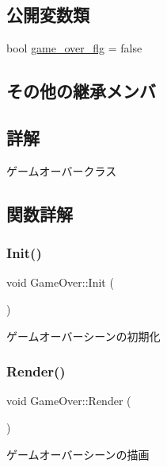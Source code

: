 \subsection*{公開変数類}
\begin{DoxyCompactItemize}
\item 
bool \mbox{\hyperlink{class_game_over_a7de925db0f485b924ef29f4649d2984d}{game\+\_\+over\+\_\+flg}} = false
\end{DoxyCompactItemize}
\subsection*{その他の継承メンバ}


\subsection{詳解}
ゲームオーバークラス 

\subsection{関数詳解}
\mbox{\label{class_game_over_ac13d1bd0fe9f8db0ef0301c9ec63a9e0}} 
\subsubsection{\texorpdfstring{Init()}{Init()}}
{\footnotesize\ttfamily void Game\+Over\+::\+Init (\begin{DoxyParamCaption}{ }\end{DoxyParamCaption})}



ゲームオーバーシーンの初期化 

\mbox{\label{class_game_over_ae16a875f25d87d8d368f24db4137f4c1}} 
\subsubsection{\texorpdfstring{Render()}{Render()}}
{\footnotesize\ttfamily void Game\+Over\+::\+Render (\begin{DoxyParamCaption}{ }\end{DoxyParamCaption})}



ゲームオーバーシーンの描画 


